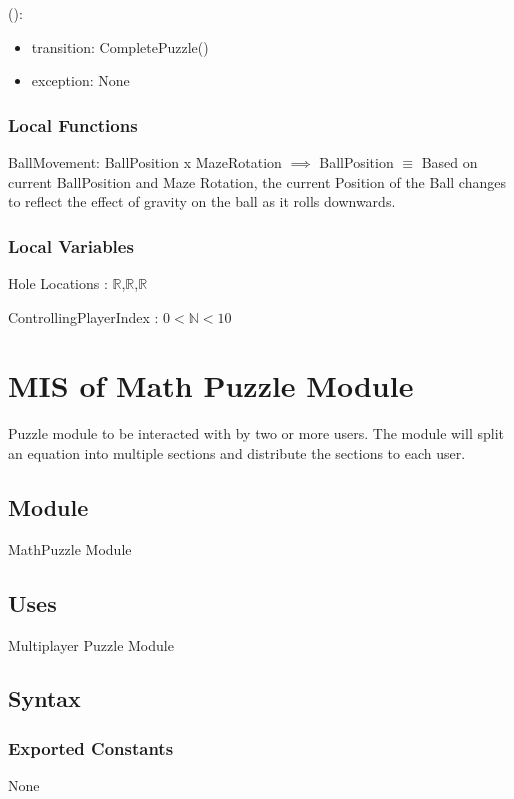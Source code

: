 \documentclass[12pt, titlepage]{article}
\begin{document}
():
\begin{itemize}
\item transition: CompletePuzzle()
\item exception: None
\end{itemize}

\subsubsection{Local Functions}

BallMovement: BallPosition x MazeRotation $\implies$ BallPosition $\equiv$ Based on current BallPosition and Maze Rotation, the current Position of the Ball changes to reflect the effect of gravity on the ball as it rolls downwards. 

\subsubsection{Local Variables}

Hole Locations : {$\mathbb{R}$,$\mathbb{R}$,$\mathbb{R}$}{}

\noindent ControllingPlayerIndex : $0<\mathbb{N}<10$



\newpage 

\section{MIS of {Math Puzzle Module}} \label{MathModule} 
Puzzle module to be interacted with by two or more users. The module will split an equation into multiple sections and distribute the sections to each user.

\subsection{Module}
MathPuzzle Module
\subsection{Uses}
Multiplayer Puzzle Module

\subsection{Syntax}

\subsubsection{Exported Constants}
None
\end{document}
